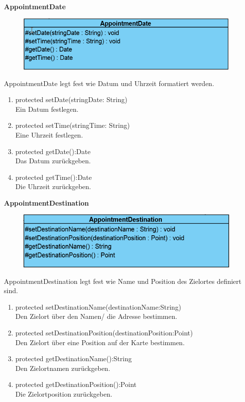 \textbf{AppointmentDate}
\begin{figure}[H]
	\includegraphics[scale = .5]{res/umlClasses/AppointmentDate.png}
	\centering
\end{figure}
AppointmentDate legt fest wie Datum und Uhrzeit formatiert werden.
\begin{enumerate}
	\item protected setDate(stringDate: String)\\
		Ein Datum festlegen.
	\item protected setTime(stringTime: String)\\
		Eine Uhrzeit festlegen.
	\item protected getDate():Date \\
		Das Datum zurückgeben.
	\item protected getTime():Date \\
		Die Uhrzeit zurückgeben.
\end{enumerate}

\textbf{AppointmentDestination}
\begin{figure}[H]
	\includegraphics[scale = .5]{res/umlClasses/AppointmentDestination.png}
	\centering
\end{figure}
AppointmentDestination legt fest wie Name und Position des Zielortes definiert sind.
\begin{enumerate}
	\item protected setDestinationName(destinationName:String)\\
		Den Zielort über den Namen/ die Adresse bestimmen.
	\item protected setDestinationPosition(destinationPosition:Point)\\
		Den Zielort über eine Position auf der Karte bestimmen.
	\item protected getDestinationName():String \\
		Den Zielortnamen zurückgeben.
	\item protected getDestinationPosition():Point \\
		Die Zielortposition zurückgeben.
\end{enumerate}

